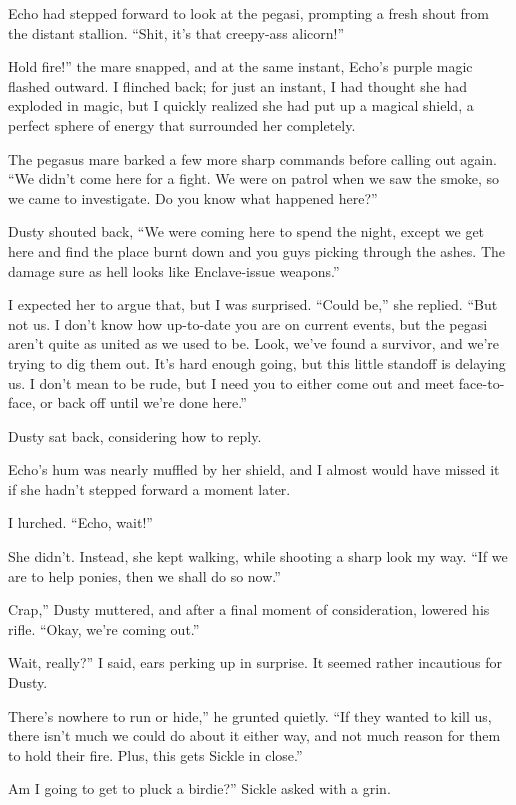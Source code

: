 Echo had stepped forward to look at the pegasi, prompting a fresh shout from the distant stallion. “Shit, it’s that creepy-ass alicorn!”

\leavevmode{}Hold fire!” the mare snapped, and at the same instant, Echo’s purple magic flashed outward. I flinched back; for just an instant, I had thought she had exploded in magic, but I quickly realized she had put up a magical shield, a perfect sphere of energy that surrounded her completely.

The pegasus mare barked a few more sharp commands before calling out again. “We didn’t come here for a fight. We were on patrol when we saw the smoke, so we came to investigate. Do you know what happened here?”

Dusty shouted back, “We were coming here to spend the night, except we get here and find the place burnt down and you guys picking through the ashes. The damage sure as hell looks like Enclave-issue weapons.”

I expected her to argue that, but I was surprised. “Could be,” she replied. “But not us. I don’t know how up-to-date you are on current events, but the pegasi aren’t quite as united as we used to be. Look, we’ve found a survivor, and we’re trying to dig them out. It’s hard enough going, but this little standoff is delaying us. I don’t mean to be rude, but I need you to either come out and meet face-to-face, or back off until we’re done here.”

Dusty sat back, considering how to reply.

Echo’s hum was nearly muffled by her shield, and I almost would have missed it if she hadn’t stepped forward a moment later.

I lurched. “Echo, wait!”

She didn’t. Instead, she kept walking, while shooting a sharp look my way. “If we are to help ponies, then we shall do so now.”

\leavevmode{}Crap,” Dusty muttered, and after a final moment of consideration, lowered his rifle. “Okay, we’re coming out.”

\leavevmode{}Wait, really?” I said, ears perking up in surprise. It seemed rather incautious for Dusty.

\leavevmode{}There’s nowhere to run or hide,” he grunted quietly. “If they wanted to kill us, there isn’t much we could do about it either way, and not much reason for them to hold their fire. Plus, this gets Sickle in close.”

\leavevmode{}Am I going to get to pluck a birdie?” Sickle asked with a grin.


